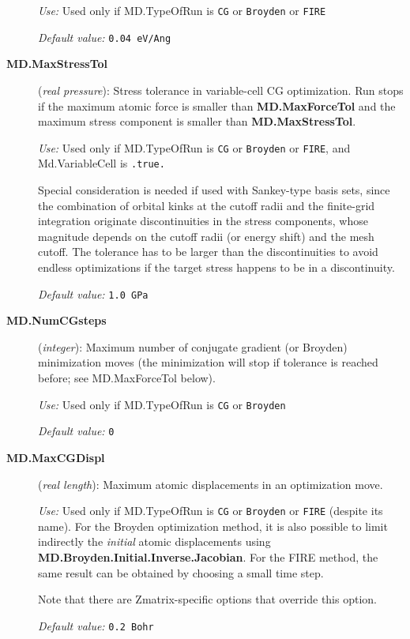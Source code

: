 \documentclass[11pt]{article}
\begin{document}
\begin{description}
{\it Use:} Used only if MD.TypeOfRun is {\tt CG} or {\tt Broyden} or
{\tt FIRE}

{\it Default value:} {\tt 0.04 eV/Ang}


\item[{\bf MD.MaxStressTol}] ({\it real pressure}):
Stress tolerance in variable-cell CG optimization. Run stops
if the maximum atomic force is smaller than {\bf MD.MaxForceTol}
and the maximum stress component is smaller than {\bf MD.MaxStressTol}.

{\it Use:} Used only if MD.TypeOfRun is {\tt CG} or {\tt Broyden} or
{\tt FIRE}, and Md.VariableCell is {\tt .true.}

Special consideration is needed if used with Sankey-type basis sets, since
the combination of orbital kinks at the cutoff radii and the finite-grid
integration originate discontinuities in the
stress components, whose magnitude depends on the cutoff radii (or
energy shift) and the mesh cutoff. The tolerance has to be larger
than the discontinuities to avoid endless optimizations if the target
stress happens to be in a discontinuity.

{\it Default value:} {\tt 1.0 GPa}


\item[{\bf MD.NumCGsteps}] ({\it integer}):
Maximum number of conjugate gradient (or Broyden) minimization
moves (the minimization will stop
if tolerance is reached before; see MD.MaxForceTol below).

{\it Use:} Used only if MD.TypeOfRun is {\tt CG} or {\tt Broyden}

{\it Default value:} {\tt 0}

\item[{\bf MD.MaxCGDispl}] ({\it real length}):
Maximum atomic displacements in an optimization move.

{\it Use:} Used only if MD.TypeOfRun is {\tt CG} or {\tt Broyden} or
{\tt FIRE} (despite its name). For the Broyden optimization method, it is also
possible to limit indirectly the {\it initial\/} atomic displacements
using {\bf MD.Broyden.Initial.Inverse.Jacobian}. For the FIRE method,
the same result can be obtained by choosing a small time step.

Note that there are Zmatrix-specific options that override this option.

{\it Default value:} {\tt 0.2 Bohr}



\end{description}
\end{document}
